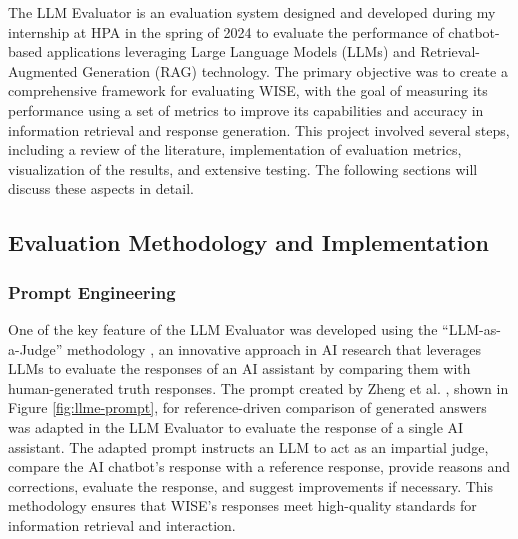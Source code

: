 The LLM Evaluator is an evaluation system designed and developed during my internship at HPA in the spring of 2024 to evaluate the performance of chatbot-based applications leveraging Large Language Models (LLMs) and Retrieval-Augmented Generation (RAG) technology. The primary objective was to create a comprehensive framework for evaluating WISE, with the goal of measuring its performance using a set of metrics to improve its capabilities and accuracy in information retrieval and response generation. This project involved several steps, including a review of the literature, implementation of evaluation metrics, visualization of the results, and extensive testing. The following sections will discuss these aspects in detail.

\subsection{Evaluation Methodology and Implementation}

\subsubsection{Prompt Engineering}

One of the key feature of the LLM Evaluator was developed using the “LLM-as-a-Judge” methodology \cite{zheng2024judging}, an innovative approach in AI research that leverages LLMs to evaluate the responses of an AI assistant by comparing them with human-generated truth responses. The prompt created by Zheng et al. \cite{zheng2024judging}, shown in Figure \ref{fig:llme-prompt}, for reference-driven comparison of generated answers was adapted in the LLM Evaluator to evaluate the response of a single AI assistant. The adapted prompt instructs an LLM to act as an impartial judge, compare the AI chatbot's response with a reference response, provide reasons and corrections, evaluate the response, and suggest improvements if necessary. This methodology ensures that WISE's responses meet high-quality standards for information retrieval and interaction.

